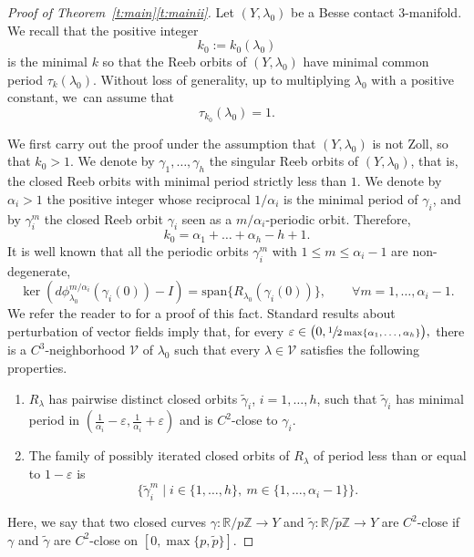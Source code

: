 \documentclass[JEP,XML,SOM,Unicode,published]{cedram}
\let\mathds\mathbb
\let\epsilon\varepsilon
\newenvironment{enumeratei}
{\bgroup\def\theenumi{\roman{enumi}}\def\theenumii{\arabic{enumii}}\begin{enumerate}}
{\end{enumerate}\egroup}
\theoremstyle{definition}
\newcommand{\Z}{\mathds{Z}}
\newcommand{\R}{\mathds{R}}
\newcommand{\VV}{\mathcal{V}}
\let\diff d
\begin{document}
\begin{proof}[Proof of Theorem~\ref{t:main}\eqref{t:mainii}]
Let $(Y,\lambda_0)$ be a Besse contact $3$-manifold. We recall that the positive integer\vspace*{-3pt}
\[
k_0:=k_0(\lambda_0)
\]
is the minimal $k$ so that the Reeb orbits of $(Y,\lambda_0)$ have minimal common period $\tau_k(\lambda_0)$. Without loss of generality, up to multiplying $\lambda_0$ with a positive constant, we~can assume that\vspace*{-3pt}
\[
\tau_{k_0}(\lambda_0)=1.
\]

We first carry out the proof under the assumption that $(Y,\lambda_0)$ is not Zoll, so that $k_0>1$. We denote by $\gamma_1,\dots,\gamma_h$ the singular Reeb orbits of $(Y,\lambda_0)$, that is, the closed Reeb orbits with minimal period strictly less than $1$.
We denote by $\alpha_i>1$ the positive integer whose reciprocal $1/\alpha_i$ is the minimal period of $\gamma_i$,
and by $\gamma_i^m$ the closed Reeb orbit $\gamma_i$ seen as a $m/\alpha_i$-periodic orbit. Therefore,\vspace*{-3pt}
\begin{equation}
\label{e:k_nonZoll}
k_0 = \alpha_1+\dots+\alpha_h - h + 1.
\end{equation}
It is well known that all the periodic orbits $\gamma_i^m$ with $1\leq m\leq \alpha_i-1$ are non-degenerate, \ie\vspace*{-3pt}
\[
\ker(\diff\phi_{\lambda_0}^{m/\alpha_i}(\gamma_i(0))-I)=\mathrm{span}\{R_{\lambda_0}(\gamma_i(0))\},\qquad\forall m=1,\dots,\alpha_i-1.
\]
We refer the reader to \cite[\S 4.1]{Cristofaro-Gardiner:2020aa} for a proof of this fact.
Standard results about perturbation of vector fields imply that, for every
$
\epsilon\in\big(0,\sfrac1{2\max\{\alpha_1,\dots,\alpha_h\}}\big),
$
there is a $C^3$-neighborhood $\VV$ of $\lambda_0$ such that every $\lambda\in\VV$ satisfies the following properties.

\begin{enumeratei}
\item\label{enum2:i}
$R_{\lambda}$ has pairwise distinct closed orbits $\tilde\gamma_i$, $i=1,\dots,h$, such that $\tilde{\gamma}_i$ has minimal period in $(\tfrac1{\alpha_i}-\epsilon,\tfrac1{\alpha_i}+\epsilon)$ and is $C^2$-close to $\gamma_i$.
\item\label{enum2:ii}
The family of possibly iterated closed orbits of $R_{\lambda}$ of period less than or equal to $1-\epsilon$ is
\[
\big\{ \tilde\gamma_i^m\mid i\in\{1,\dots,h\},\ m\in\{1,\dots,\alpha_i-1\} \big\}.
\]
\end{enumeratei}
Here, we say that two closed curves $\gamma:\R/p\Z \to Y$ and $\tilde{\gamma}:\R/\tilde{p} \Z \to Y$ are $C^2$-close if $\gamma$ and $\tilde{\gamma}$ are $C^2$-close on $[0,\max\{p,\tilde{p}\}]$.


\end{proof}
\end{document}
